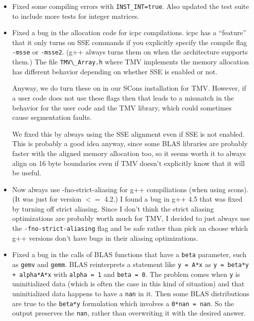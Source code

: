 \documentclass[twoside,letterpaper,11pt]{article}
\renewcommand{\tt}[1]{{\lstinline {#1}}}
\begin{document}
\begin{description}
\begin{itemize}
\item Fixed some compiling errors with \tt{INST_INT=true}.  Also updated the test suite
  to include more tests for integer matrices. 
  
\item Fixed a bug in the allocation code for icpc compilations.
   icpc has a ``feature'' that it only turns on SSE commands if you explicitly
   specify the compile flag \tt{-msse} or \tt{-msse2}.  (g++ always turns them on
   when the architecture supports them.)  The file \tt{TMV\_Array.h} where TMV implements
   the memory allocation has different
   behavior depending on whether SSE is enabled or not.

   Anyway, we do turn these on in our SCons installation for TMV.
   However, if a user code does not use these flags then that leads to a
   mismatch in the behavior for the user code and the TMV
   library, which could sometimes cause segmentation faults.

   We fixed this by always using the SSE alignment even if SSE is not
   enabled.  This is probably a good idea anyway, since some BLAS libraries
   are probably faster with the aligned memory allocation too, so it
   seems worth it to always align on 16 byte boundaries even if TMV
   doesn't explicitly know that it will be useful.
  
\item Now always use -fno-strict-aliasing for g++ compiliations (when using scons).
   (It was
   just for version $<=$ 4.2.)  I found a bug in g++ 4.5 that was fixed by
   turning off strict aliasing.  Since I don't think the strict aliasing
   optimizations are probably worth much for TMV, I decided to just always
   use the \tt{-fno-strict-aliasing} flag and be safe rather than pick an choose which
   g++ versions don't have bugs in their aliasing optimizations.

\item Fixed a bug in the calls of BLAS functions that have a
   \tt{beta} parameter, such as \tt{gemv} and \tt{gemm}.  
   BLAS reinterprets a statement like \tt{y = A*x} as
   \tt{y = beta*y + alpha*A*x} with \tt{alpha = 1} and \tt{beta = 0}.  The problem
   comes when \tt{y} is uninitialized data (which is often the case in this kind of
   situation) and that uninitialized data happens to have a \tt{nan} in it.
   Then some BLAS distributions are true to the \tt{beta*y} formulation which
   involves a \tt{0*nan = nan}.  So the output preserves the \tt{nan}, rather than
   overwriting it with the desired answer.


\end{itemize}
\end{description}
\end{document}
